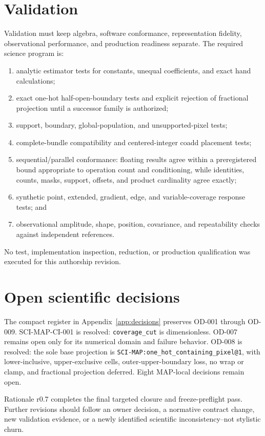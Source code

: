 \documentclass[10pt]{article}
\newcommand{\code}[1]{\nolinkurl{#1}}
\begin{document}
\section{Validation}\label{sec:validation}
Validation must keep algebra, software conformance, representation fidelity,
observational performance, and production readiness separate. The required
science program is:
\begin{enumerate}[label=\textbf{\arabic*.},leftmargin=*]
\item analytic estimator tests for constants, unequal coefficients, and exact
hand calculations;
\item exact one-hot half-open-boundary tests and explicit rejection of
fractional projection until a successor family is authorized;
\item support, boundary, global-population, and unsupported-pixel tests;
\item complete-bundle compatibility and centered-integer coadd placement
tests;
\item sequential/parallel conformance: floating results agree within a
preregistered bound appropriate to operation count and conditioning, while
identities, counts, masks, support, offsets, and product cardinality agree
exactly;
\item synthetic point, extended, gradient, edge, and variable-coverage
response tests; and
\item observational amplitude, shape, position, covariance, and repeatability
checks against independent references.
\end{enumerate}
No test, implementation inspection, reduction, or production qualification
was executed for this authorship revision.

\section{Open scientific decisions}\label{sec:decisions}
The compact register in Appendix~\ref{app:decisions} preserves OD-001 through
OD-009. SCI-MAP-CI-001 is resolved: \code{coverage_cut} is dimensionless.
OD-007 remains open only for its numerical domain and failure behavior.
OD-008 is resolved: the sole base projection is
\code{SCI-MAP:one_hot_containing_pixel@1}, with lower-inclusive,
upper-exclusive cells, outer-upper-boundary loss, no wrap or clamp, and
fractional projection deferred. Eight MAP-local decisions remain open.

Rationale r0.7 completes the final targeted closure and freeze-preflight pass.
Further revisions should follow an owner decision, a normative contract
change, new validation evidence, or a newly identified scientific
inconsistency--not stylistic churn.
\end{document}
